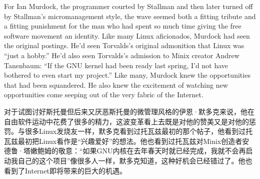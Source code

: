 \ifdefined\eng
For Ian Murdock, the programmer courted by Stallman and then later turned off by Stallman's micromanagement style, the wave seemed both a fitting tribute and a fitting punishment for the man who had spent so much time giving the free software movement an identity. Like many Linux aficionados, Murdock had seen the original postings. He'd seen Torvalds's original admonition that Linux was ``just a hobby.'' He'd also seen Torvalds's admission to Minix creator Andrew Tanenbaum: ``If the GNU kernel had been ready last spring, I'd not have bothered to even start my project.'' Like many, Murdock knew the opportunities that had been squandered. He also knew the excitement of watching new opportunities come seeping out of the very fabric of the Internet.
\fi

\ifdefined\chs
对于试图讨好斯托曼但后来又厌恶斯托曼的微管理风格的伊恩·默多克来说，他在自由软件运动中花费了很多的精力，这波变革看上去既是对他的赞美又是对他的惩罚。与很多Linux发烧友一样，默多克看到过托瓦兹最初的那个帖子，他看到过托瓦兹最初把Linux看作是``兴趣爱好''的想法。他也看到过托瓦兹对Minix创造者安德鲁·塔嫩鲍姆的敬意：``如果GNU内核在去年春天时就已经完成，我就不会再启动我自己的这个项目''像很多人一样，默多克知道，这种好机会已经错过了。他也看到了Internet即将带来的巨大的机遇。
\fi

